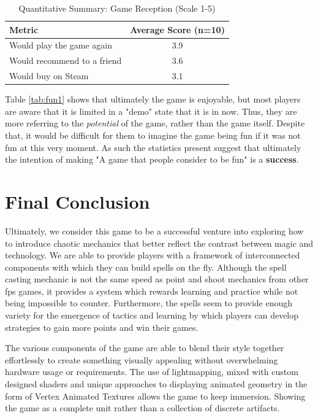 \documentclass[12pt,a4paper]{report}
\begin{document}
\begin{table}[h]
\centering
\caption{Quantitative Summary: Game Reception (Scale 1-5)}
\label{tab:fun2}
\begin{tabular}{l c}
\hline
\textbf{Metric} & \textbf{Average Score (n=10)} \\
\hline
Would play the game again & 3.9 \\
Would recommend to a friend & 3.6 \\
Would buy on Steam & 3.1 \\
\hline
\end{tabular}
\end{table}

Table \ref{tab:fun1} shows that ultimately the game is enjoyable, but most players are aware that it is limited in a "demo" state that it is in now. Thus, they are more referring to the \textit{potential} of the game, rather than the game itself. Despite that, it would be difficult for them to imagine the game being fun if it was not fun at this very moment. As such the statistics present suggest that ultimately the intention of making "A game that people consider to be fun" is a \textbf{success}.

\chapter{Final Conclusion}

Ultimately, we consider this game to be a successful venture into exploring how to introduce chaotic mechanics that better reflect the contrast between magic and technology. We are able to provide players with a framework of interconnected components with which they can build spells on the fly. Although the spell casting mechanic is not the same speed as point and shoot mechanics from other \gls{fps} games, it provides a system which rewards learning and practice while not being impossible to counter. Furthermore, the spells seem to provide enough variety for the emergence of tactics and learning by which players can develop strategies to gain more points and win their games. 

The various components of the game are able to blend their style together effortlessly to create something visually appealing without overwhelming hardware usage or requirements. The use of lightmapping, mixed with custom designed shaders and unique approaches to displaying animated geometry in the form of Vertex Animated Textures allows the game to keep immersion. Showing the game as a complete unit rather than a collection of discrete artifacts.
\end{document}
